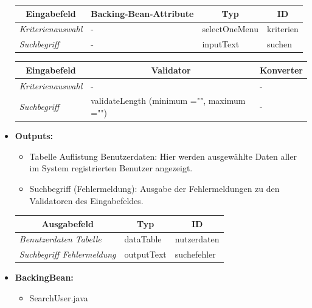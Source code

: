 \begin{itemize}
\begin{center}
\begin{longtable}{|p{3cm} |p{5cm} | p{4cm}|p{3cm}|}
						\hline \multicolumn{1}{|c|}{\textbf{Eingabefeld}} & \multicolumn{1}{|c|}{\textbf{Backing-Bean-Attribute}} & \multicolumn{1}{|c|}{\textbf{Typ}}  &  \multicolumn{1}{|c|}{\textbf{ID}} \\ \hline
						\endfirsthead
						\hline
						\endlastfoot
						\textit{Kriterienauswahl} & - & selectOneMenu & kriterien \\ \hline
						\textit{Suchbegriff} & - & inputText & suchen \\ \hline
					\end{longtable}
				\end{center}
				
				\begin{center}
					\begin{longtable}{|p{3cm} |p{8cm} | p{5cm}|}
						
						\hline \multicolumn{1}{|c|}{\textbf{Eingabefeld}} & \multicolumn{1}{|c|}{\textbf{Validator}} & \multicolumn{1}{|c|}{\textbf{Konverter}} \\ \hline
						\endfirsthead
						\hline
						\endlastfoot
						\textit{Kriterienauswahl} & - & - \\ \hline
						\textit{Suchbegriff} & validateLength (minimum ="", maximum ="") & - \\ \hline
					\end{longtable}
				\end{center}
				
			\item \textbf{Outputs:}
				\begin{itemize}
					\item Tabelle Auflistung Benutzerdaten: Hier werden ausgewählte Daten aller im System registrierten Benutzer angezeigt.
					\item Suchbegriff (Fehlermeldung): Ausgabe der Fehlermeldungen zu den Validatoren des Eingabefeldes.
				\end{itemize}
				
					\begin{center}
						\begin{longtable}{|p{5cm} | p{4cm}|p{3cm}|}
							
							\hline \multicolumn{1}{|c|}{\textbf{Ausgabefeld}} & \multicolumn{1}{|c|}{\textbf{Typ}}  &  \multicolumn{1}{|c|}{\textbf{ID}} \\ \hline
							\endfirsthead
							\hline
							\endlastfoot
							\textit{Benutzerdaten Tabelle}  & dataTable & nutzerdaten \\ \hline
							\textit{Suchbegriff Fehlermeldung}  & outputText & suchefehler \\ \hline
						\end{longtable}
					\end{center}
				
			\item \textbf{BackingBean:}
				\begin{itemize}
					\item SearchUser.java
				\end{itemize}
		\end{itemize}
		
